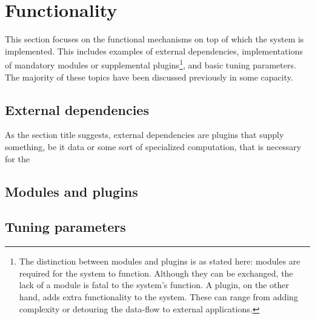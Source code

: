 \documentclass{article}
\numberwithin{equation}{section}
\begin{document}
\section{Functionality} \label{func}

        This section focuses on the functional mechanisms on top of which the system is implemented.
        This includes examples of external dependencies, implementations of mandatory modules or supplemental
        plugins\footnote{
            The distinction between modules and plugins is as stated here: modules are required for the system to
            function.
            Although they can be exchanged, the lack of a module is fatal to the system's function.
            A plugin, on the other hand, adds extra functionality to the system.
            These can range from adding complexity or detouring the data-flow to external applications.
        }, and basic tuning parameters.
        The majority of these topics have been discussed previously in some capacity.

        \subsection{External dependencies} \label{funcext}

            As the section title suggests, external dependencies are plugins that supply something, be it data or
            some sort of specialized computation, that is necessary for the 

        \subsection{Modules and plugins} \label{funcplug}


        \subsection{Tuning parameters} \label{funcparm}
\end{document}
